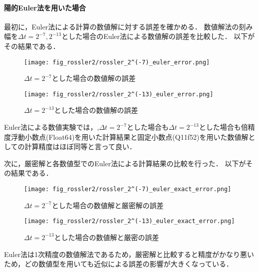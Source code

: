 \paragraph*{陽的Euler法を用いた場合}
最初に，Euler法による計算の数値解に対する誤差を確かめる．
数値解法の刻み幅を$\Delta t = 2^{-7},2^{-13}$とした場合のEuler法による数値解の誤差を比較した．
以下がその結果である．
\begin{figure}[H]
    \centering
    \begin{minipage}[b]{0.49\columnwidth}
        \centering
        \texttt{[image: fig\_rossler2/rossler\_2^(-7)\_euler\_error.png]}
        \caption{$\Delta t = 2^{-7}$とした場合の数値解の誤差}
        \label{fig:rossler_2^(-7)_euler_error}
    \end{minipage}
    \begin{minipage}[b]{0.49\columnwidth}
        \centering
        \texttt{[image: fig\_rossler2/rossler\_2^(-13)\_euler\_error.png]}
        \caption{$\Delta t =  2^{-13}$とした場合の数値解の誤差}
        \label{fig:rossler_2^(-13)_euler_error}
    \end{minipage}
\end{figure} 
Euler法による数値実験では，,$\Delta t = 2^{-7}$とした場合も$\Delta t =  2^{-13}$とした場合も倍精度浮動小数点(Float64)を用いた計算結果と固定小数点(Q11f52)を用いた数値解としての計算精度はほぼ同等と言って良い．


次に，厳密解と各数値型でのEuler法による計算結果の比較を行った．
以下がその結果である．\\
\begin{figure}[H]
    \centering
    \begin{minipage}[b]{0.49\columnwidth}
        \centering
        \texttt{[image: fig\_rossler2/rossler\_2^(-7)\_euler\_exact\_error.png]}
        \caption{$\Delta t = 2^{-7}$とした場合の数値解と厳密解の誤差}
        \label{fig:rossler_2^(-7)_eluer_exact_error}
    \end{minipage}
    \begin{minipage}[b]{0.49\columnwidth}
        \centering
        \texttt{[image: fig\_rossler2/rossler\_2^(-13)\_euler\_exact\_error.png]}
        \caption{$\Delta t =  2^{-13}$とした場合の数値解と厳密の誤差}
        \label{fig:rossler_2^(-13)_euler_exact_error}
    \end{minipage}
\end{figure}
Euler法は1次精度の数値解法であるため，厳密解と比較すると精度がかなり悪いため，どの数値型を用いても近似による誤差の影響が大きくなっている．

